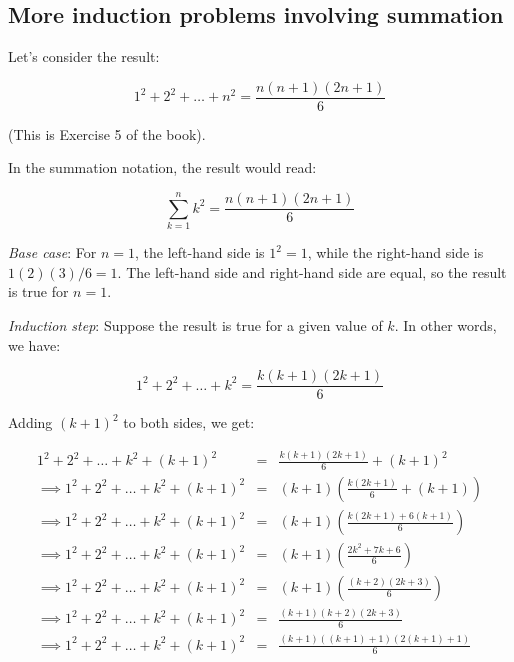\documentclass{amsart}
\begin{document}
\subsection{More induction problems involving summation}

Let's consider the result:

\begin{equation*}
  1^2 + 2^2 + \dots + n^2 = \frac{n(n+1)(2n+1)}{6}
\end{equation*}

(This is Exercise 5 of the book).

In the summation notation, the result would read:

\begin{equation*}
  \sum_{k=1}^n k^2 = \frac{n(n+1)(2n+1)}{6}
\end{equation*}

{\em Base case}: For $n = 1$, the left-hand side is $1^2 = 1$, while
the right-hand side is $1(2)(3)/6 = 1$. The left-hand side and
right-hand side are equal, so the result is true for $n = 1$.

{\em Induction step}: Suppose the result is true for a given value of
$k$. In other words, we have:

\begin{equation*}
  1^2 + 2^2 + \dots + k^2 = \frac{k(k+1)(2k+1)}{6} \tag{*}
\end{equation*}

Adding $(k+1)^2$ to both sides, we get:

\begin{eqnarray*}
  1^2 + 2^2 + \dots + k^2 + (k+1)^2 & = & \frac{k(k+1)(2k+1)}{6} + (k + 1)^2\\
  \implies 1^2 + 2^2 + \dots + k^2 + (k+1)^2 & = & (k+1) \left(\frac{k(2k+1)}{6} + (k + 1) \right)\\
  \implies 1^2 + 2^2 + \dots + k^2 + (k+1)^2 & = & (k+1) \left(\frac{k(2k+1) + 6(k+1)}{6} \right)\\
  \implies 1^2 + 2^2 + \dots + k^2 + (k+1)^2 & = & (k+1) \left(\frac{2k^2 + 7k + 6}{6} \right)\\
  \implies 1^2 + 2^2 + \dots + k^2 + (k+1)^2 & = & (k+1) \left(\frac{(k + 2)(2k + 3)}{6} \right)\\
  \implies 1^2 + 2^2 + \dots + k^2 + (k+1)^2 & = & \frac{(k + 1)(k + 2)(2k + 3)}{6}\\
  \implies 1^2 + 2^2 + \dots + k^2 + (k+1)^2 & = & \frac{(k + 1)((k + 1) + 1)(2(k + 1) + 1)}{6}
\end{eqnarray*}
\end{document}
